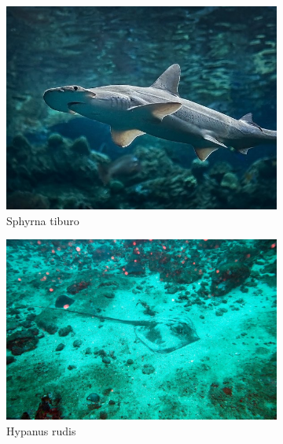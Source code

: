 \documentclass[10pt]{article}
\begin{document}
\begin{figure}
     \centering
     \begin{subfigure}[b]{0.45\textwidth}
         \centering
         \includegraphics[width=\textwidth]{images/sphyrna_tiburo.jpg}
         \caption{Sphyrna tiburo}
     \end{subfigure}
     \hfill
     \begin{subfigure}[b]{0.45\textwidth}
         \centering
         \includegraphics[width=\textwidth]{images/hypanus_rudis.jpg}
         \caption{Hypanus rudis}
     \end{subfigure}
     \hfill
     \begin{subfigure}[b]{0.45\textwidth}
         \centering

\end{subfigure}
\end{figure}
\end{document}
